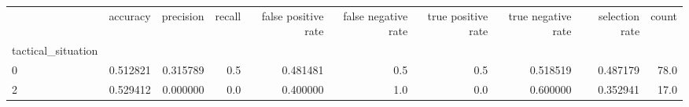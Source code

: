 \begin{tabular}{lrrrrrrrrr}
\toprule
{} &  accuracy &  precision &  recall &  false positive rate &  false negative rate &  true positive rate &  true negative rate &  selection rate &  count \\
tactical\_situation &           &            &         &                      &                      &                     &                     &                 &        \\
\midrule
0                  &  0.512821 &   0.315789 &     0.5 &             0.481481 &                  0.5 &                 0.5 &            0.518519 &        0.487179 &   78.0 \\
2                  &  0.529412 &   0.000000 &     0.0 &             0.400000 &                  1.0 &                 0.0 &            0.600000 &        0.352941 &   17.0 \\
\bottomrule
\end{tabular}
